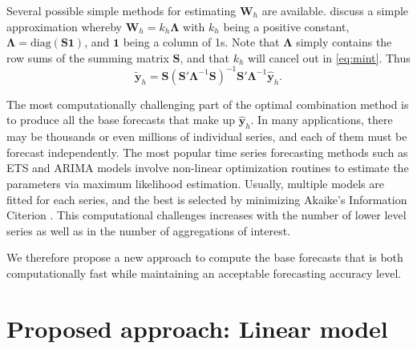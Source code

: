 \documentclass[11pt,a4paper,]{article}
\begin{document}
Several possible simple methods for estimating \(\bm{W}_h\) are available. \textcite{mint2018} discuss a simple approximation whereby \(\bm{W}_h = k_h \bm{\Lambda}\) with \(k_h\) being a positive constant, \(\bm{\Lambda} = \text{diag}(\bm{S}\bm{1})\), and \(\bm{1}\) being a column of 1s. Note that \(\bm{\Lambda}\) simply contains the row sums of the summing matrix \(\bm{S}\), and that \(k_h\) will cancel out in \eqref{eq:mint}. Thus
\begin{equation}\label{eq:mint2}
  \tilde{\bm{y}}_{h}=\bm{S}(\bm{S}'\bm{\Lambda}^{-1}\bm{S})^{-1}\bm{S}'\bm{\Lambda}^{-1}\hat{\bm{y}}_h.
\end{equation}

The most computationally challenging part of the optimal combination method is to produce all the base forecasts that make up \(\hat{\bm{y}}_h\). In many applications, there may be thousands or even millions of individual series, and each of them must be forecast independently. The most popular time series forecasting methods such as ETS and ARIMA models \autocite{fpp2} involve non-linear optimization routines to estimate the parameters via maximum likelihood estimation. Usually, multiple models are fitted for each series, and the best is selected by minimizing Akaike's Information Citerion \autocite{akaike1998information}. This computational challenges increases with the number of lower level series as well as in the number of aggregations of interest.

We therefore propose a new approach to compute the base forecasts that is both computationally fast while maintaining an acceptable forecasting accuracy level.

\hypertarget{proposed-approach-linear-model}{%
\section{\texorpdfstring{Proposed approach: Linear model \label{sec:proposedapproach1}}{Proposed approach: Linear model }}\label{proposed-approach-linear-model}}
\end{document}
